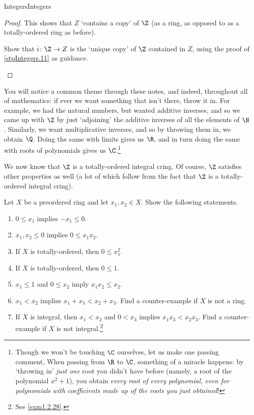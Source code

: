 \begin{thm}{Integers}{Integers}
\begin{proof}
This shows that $Z$ `contains a copy' of $\Z$ (as a ring, as opposed to as a totally-ordered ring as before).
\begin{exr}[breakable=false]{}{}
Show that $i\colon \Z \rightarrow Z$ is the `unique copy' of $\Z$ contained in $Z$, using the proof of \cref{stpIntegers.11} as guidance.
\end{exr}
\end{proof}
\end{thm}
You will notice a common theme through these notes, and indeed, throughout all of mathematics:  if ever we want something that isn't there, throw it in.  For example, we had the natural numbers, but wanted additive inverses, and so we came up with $\Z$ by just `adjoining' the additive inverses of all the elements of $\N$.  Similarly, we want multiplicative inverses, and so by throwing them in, we obtain $\Q$.  Doing the same with limits gives us $\R$, and in turn doing the same with roots of polynomials gives us $\C$.\footnote{Though we won't be touching $\C$ ourselves, let us make one passing comment,  When passing from $\R$ to $\C$, something of a miracle happens:  by `throwing in' \emph{just one} root you didn't have before (namely, a root of the polynomial $x^2+1$), you obtain \emph{every root of every polynomial, even for polynomials with coefficients made up of the roots you just obtained}!}

We now know that $\Z$ is a totally-ordered integral cring.  Of course, $\Z$ satisfies other properties as well (a lot of which follow from the fact that $\Z$ is a totally-ordered integral cring).
\begin{exr}{}{}
Let $X$ be a preordered ring and let $x_1,x_2\in X$.  Show the following statements.
\begin{enumerate}
\item $0\leq x_1$ implies $-x_1\leq 0$.
\item $x_1,x_2\leq 0$ implies $0\leq x_1x_2$.
\item If $X$ is totally-ordered, then $0\leq x_1^2$.
\item If $X$ is totally-ordered, then $0\leq 1$.
\item $x_1\leq 1$ and $0\leq x_2$ imply $x_1x_2\leq x_2$.
\item $x_1<x_2$ implies $x_1+x_3<x_2+x_3$.  Find a counter-example if $X$ is not a ring.
\item If $X$ is integral, then $x_1<x_2$ and $0<x_3$ implies $x_1x_3<x_2x_3$.  Find a counter-example if $X$ is not integral.\footnote{See \cref{exm1.2.28}.}
\end{enumerate}
\end{exr}

